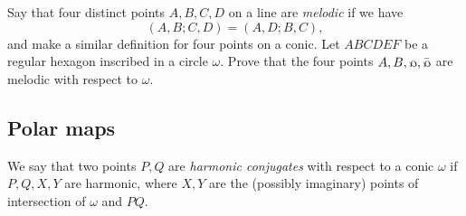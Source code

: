 \begin{exer}\label{melodic} Say that four distinct points $A,B,C,D$ on a line are \emph{melodic} if we have
\[
(A,B;C,D) = (A,D;B,C),
\]
and make a similar definition for four points on a conic. Let $ABCDEF$ be a regular hexagon inscribed in a circle $\omega$. Prove that the four points $A,B,\fish,\bar\fish$ are melodic with respect to $\omega$.
\end{exer}


\subsection{Polar maps}

\begin{defn} We say that two points $P,Q$ are \emph{harmonic conjugates} with respect to a conic $\omega$ if $P,Q,X,Y$ are harmonic, where $X,Y$ are the (possibly imaginary) points of intersection of $\omega$ and $PQ$.
\end{defn}

